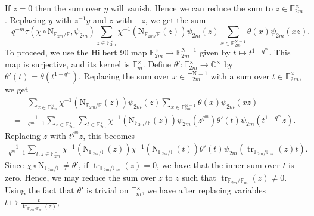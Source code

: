 \documentclass[12pt, reqno]{amsart}
\theoremstyle{definition}
\theoremstyle{definition}
\theoremstyle{definition}
\newcommand{\cComplex}{\mathbb{C}}
\newcommand{\multiplicativegroup}[1]{#1^{\times}}
\newcommand{\fieldCharacter}{\psi}
\newcommand{\trace}{\operatorname{tr}}
\newcommand{\aFieldNorm}{\mathrm{N}}
\newcommand{\finiteField}{\mathbb{F}}
\newcommand{\finiteFieldExtension}[1]{\finiteField_{#1}}
\newcommand{\NormOneGroup}[1]{\finiteFieldExtension{#1}^{\aFieldNorm = 1}}
\begin{document}
If $z=0$ then the sum over $y$ will vanish. Hence we can reduce the sum to $z \in \multiplicativegroup{\finiteFieldExtension{2m}}$. Replacing $y$ with $z^{-1} y$ and $z$ with $-z$, we get the sum
$$-q^{-m} \tau\left(\chi \circ \aFieldNorm_{\finiteFieldExtension{2m} \slash \finiteField}, \fieldCharacter_{2m}\right) \sum_{z \in \multiplicativegroup{\finiteFieldExtension{2m}}} \chi^{-1}\left(\aFieldNorm_{\finiteFieldExtension{2m} \slash \finiteField}\left(z\right)\right) \fieldCharacter_{2m}\left(z\right)  \sum_{x \in \NormOneGroup{2m}} \theta \left(x\right) \fieldCharacter_{2m}\left(xz\right).$$
To proceed, we use the Hilbert 90 map $\multiplicativegroup{\finiteFieldExtension{2m}} \to \NormOneGroup{2m}$ given by $t \mapsto t^{1 - q^m}$. This map is surjective, and its kernel is $\multiplicativegroup{\finiteFieldExtension{m}}$. Define $\theta' \colon \multiplicativegroup{\finiteFieldExtension{2m}} \to \multiplicativegroup{\cComplex}$ by $\theta'\left(t\right) = \theta\left(t^{1-q^m}\right)$. Replacing the sum over $x \in \NormOneGroup{2m}$ with a sum over $t \in \multiplicativegroup{\finiteFieldExtension{2m}}$, we get \begin{align*}
	& \sum_{z \in \multiplicativegroup{\finiteFieldExtension{2m}}} \chi^{-1}\left(\aFieldNorm_{\finiteFieldExtension{2m} \slash \finiteField}\left(z\right)\right) \fieldCharacter_{2m}\left(z\right) \sum_{x \in \NormOneGroup{2m}} \theta \left(x\right) \fieldCharacter_{2m}\left(xz\right) \\
	= & \frac{1}{q^m-1}\sum_{z \in \multiplicativegroup{\finiteFieldExtension{2m}}} \sum_{t \in \multiplicativegroup{\finiteFieldExtension{2m}}} \chi^{-1}\left(\aFieldNorm_{\finiteFieldExtension{2m} \slash \finiteField}\left(z\right)\right) \fieldCharacter_{2m}\left(z^{q^m}\right) \theta' \left(t\right) \fieldCharacter_{2m}\left(t^{1-q^m} z\right).
\end{align*}
Replacing $z$ with $t^{q^m} z$, this becomes
\begin{align*}
	\frac{1}{q^m-1}\sum_{t,z \in \multiplicativegroup{\finiteFieldExtension{2m}}} \chi^{-1}\left(\aFieldNorm_{\finiteFieldExtension{2m} \slash \finiteField}\left(z\right)\right) \chi^{-1}\left(\aFieldNorm_{\finiteFieldExtension{2m} \slash \finiteField}\left(t\right)\right) \theta' \left(t\right) \fieldCharacter_{2m}\left(\trace_{\finiteFieldExtension{2m} \slash \finiteFieldExtension{m}}\left(z\right) t\right).
\end{align*}
Since $\chi \circ \aFieldNorm_{\finiteFieldExtension{2m} \slash \finiteField} \ne \theta'$, if $\trace_{\finiteFieldExtension{2m} \slash \finiteFieldExtension{m}}\left(z\right) = 0$, we have that the inner sum over $t$ is zero. Hence, we may reduce the sum over $z$ to $z$ such that $\trace_{\finiteFieldExtension{2m} \slash \finiteFieldExtension{m}}\left(z\right) \ne 0$. Using the fact that $\theta'$ is trivial on $\multiplicativegroup{\finiteFieldExtension{m}}$, we have after replacing variables $t \mapsto \frac{t}{\trace_{\finiteFieldExtension{2m} \slash \finiteFieldExtension{m}}\left(z\right)}$,
\end{document}
